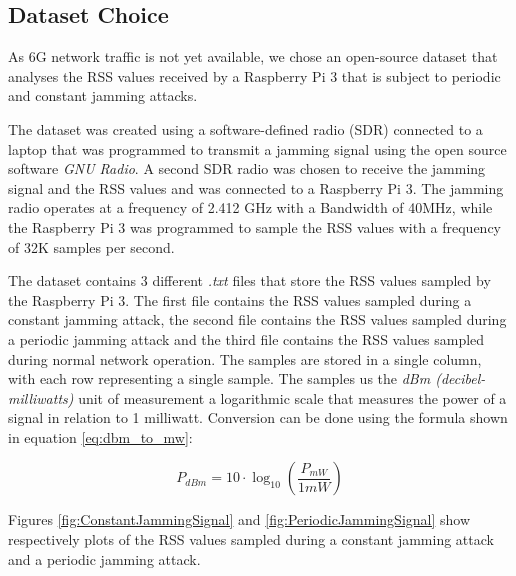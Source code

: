 \documentclass[futureinternet,article,submit,pdftex,moreauthors]{Definitions/mdpi}
\begin{document}
\subsection{Dataset Choice}

As 6G network traffic is not yet available, we chose an open-source dataset \cite{JammingDetectionIoT-Hussain} that analyses the RSS values 
received by a Raspberry Pi 3 that is subject to periodic and constant jamming attacks. 

The dataset was created using a software-defined radio (SDR) connected to a laptop that was programmed to transmit a jamming signal using the 
open source software \textit{GNU Radio}. A second SDR radio was chosen to receive the jamming signal and the RSS values and was connected 
to a Raspberry Pi 3. The jamming radio operates at a frequency of 2.412 GHz with a Bandwidth of 40MHz, while the Raspberry Pi 3 was programmed to sample the RSS values with a 
frequency of 32K samples per second. 

The dataset contains 3 different \textit{.txt} files that store the RSS values sampled by the Raspberry Pi 3. The first file contains the RSS values sampled during a constant jamming attack, the second file contains the RSS values sampled during a periodic jamming attack and the third file contains the RSS values sampled during normal network operation.
The samples are stored in a single column, with each row representing a single sample. The samples us the \textit{dBm (decibel-milliwatts)} unit of measurement a logarithmic scale that measures the power of a signal in relation to 1 milliwatt. 
Conversion can be done using the formula \cite{WirelessCommSobot} shown in equation \ref{eq:dbm_to_mw}:

\begin{linenomath}
	\begin{equation}
		P_{dBm} = 10 \cdot \log_{10} \left( \frac{P_{mW}}{1mW} \right)
		\label{eq:dbm_to_mw}
	\end{equation}
\end{linenomath}

Figures \ref{fig:ConstantJammingSignal} and \ref{fig:PeriodicJammingSignal} show respectively plots of the RSS values sampled during a constant jamming attack and a periodic jamming attack. 
\end{document}
